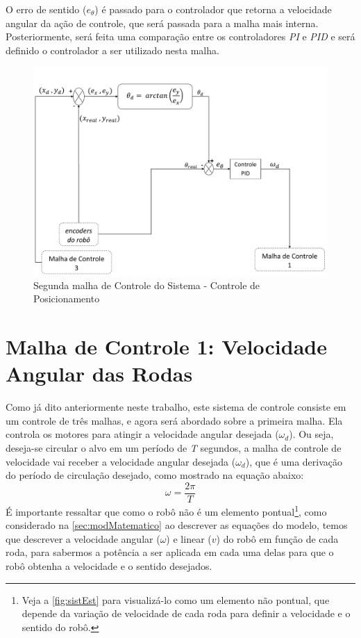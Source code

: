 O erro de sentido (\emph{$e_{\theta}$}) é passado para o controlador que retorna a velocidade angular da ação de controle, que será passada para a malha mais interna. Posteriormente, será feita uma comparação entre os controladores \emph{PI} e \emph{PID} e será definido o controlador a ser utilizado nesta malha.

\begin{figure}[!htb]
	\centering
	\includegraphics[width=1.0\textwidth]{./04-figuras/malha2}
	\caption{Segunda malha de Controle do Sistema - Controle de Posicionamento}
	\label{fig:malha2}
\end{figure}

 
\section{Malha de Controle 1: Velocidade Angular das Rodas}
\label{sec:malha1 } 
Como já dito anteriormente neste trabalho, este sistema de controle consiste em um controle de três malhas, e agora será abordado sobre a primeira malha. Ela controla os motores para atingir a velocidade angular desejada ($ \omega _{d} $). Ou seja, deseja-se circular o alvo em um período de \emph{T} segundos, a malha de controle de velocidade vai receber a velocidade angular desejada ($ \omega _{d} $), que é uma derivação do período de circulação desejado, como mostrado na equação abaixo:
\begin{equation}
\omega = \dfrac{2\pi}{T}
\label{eq:velocangular}
\end{equation}
É importante ressaltar que como o robô não é um elemento pontual\footnote{Veja a \autoref{fig:sistEst} para visualizá-lo como um elemento não pontual, que depende da variação de velocidade de cada roda para definir a velocidade e o sentido do robô.}, como considerado na \autoref{sec:modMatematico} ao descrever as equações do modelo, temos que descrever a velocidade angular (\emph{$\omega$}) e linear (\emph{$v$}) do robô em função de cada roda, para sabermos a potência a ser aplicada em cada uma delas para que o robô obtenha a velocidade e o sentido desejados.

